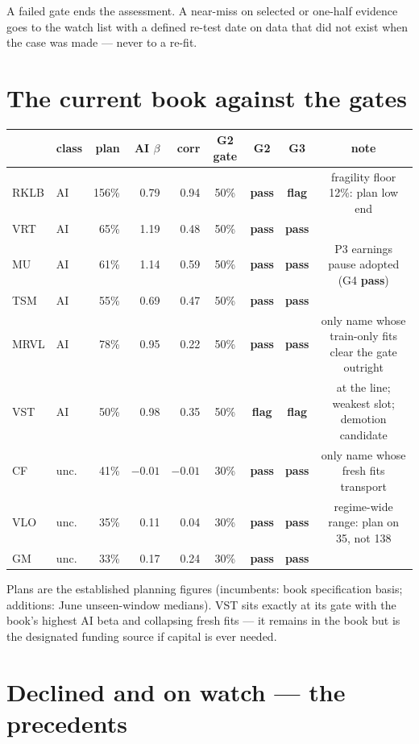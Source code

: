 \documentclass[11pt,a4paper]{article}
\newcommand{\tabnote}[1]{\begin{center}\begin{minipage}{0.92\textwidth}
  \footnotesize\color{bcgrey}#1\end{minipage}\end{center}}
\newcommand{\pass}{{\color{bcteal}\textbf{pass}}}
\newcommand{\flagg}{{\color{bcgold}\textbf{flag}}}
\begin{document}
\tabnote{A failed gate ends the assessment. A near-miss on selected or one-half
evidence goes to the watch list with a defined re-test date on data that did not
exist when the case was made --- never to a re-fit.}

\section{The current book against the gates}

\begin{center}
\small
\begin{tabular}{llrrrcccc}
\toprule
 & class & plan & AI $\beta$ & corr & G2 gate & G2 & G3 & note \\
\midrule
RKLB & AI    & 156\% & 0.79 & 0.94 & 50\% & \pass & \flagg & fragility floor 12\%: plan low end \\
VRT  & AI    &  65\% & 1.19 & 0.48 & 50\% & \pass & \pass & \\
MU   & AI    &  61\% & 1.14 & 0.59 & 50\% & \pass & \pass & P3 earnings pause adopted (G4 \pass) \\
TSM  & AI    &  55\% & 0.69 & 0.47 & 50\% & \pass & \pass & \\
MRVL & AI    &  78\% & 0.95 & 0.22 & 50\% & \pass & \pass & only name whose train-only fits clear the gate outright \\
VST  & AI    &  50\% & 0.98 & 0.35 & 50\% & \flagg & \flagg & at the line; weakest slot; demotion candidate \\
CF   & unc.  &  41\% & $-0.01$ & $-0.01$ & 30\% & \pass & \pass & only name whose fresh fits transport \\
VLO  & unc.  &  35\% & 0.11 & 0.04 & 30\% & \pass & \pass & regime-wide range: plan on 35, not 138 \\
GM   & unc.  &  33\% & 0.17 & 0.24 & 30\% & \pass & \pass & \\
\bottomrule
\end{tabular}
\end{center}

\tabnote{Plans are the established planning figures (incumbents: book
specification basis; additions: June unseen-window medians). VST sits exactly at
its gate with the book's highest AI beta and collapsing fresh fits --- it remains
in the book but is the designated funding source if capital is ever needed.}

\section{Declined and on watch --- the precedents}
\end{document}
